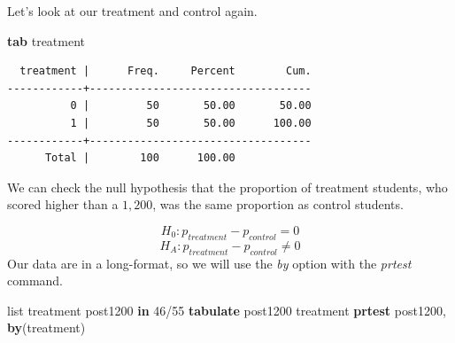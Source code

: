 \documentclass[
]{book}
\newenvironment{Shaded}{\begin{snugshade}}{\end{snugshade}}
\newcommand{\KeywordTok}[1]{\textcolor[rgb]{0.13,0.29,0.53}{\textbf{#1}}}
\newcommand{\NormalTok}[1]{#1}
\newcommand{\OtherTok}[1]{\textcolor[rgb]{0.56,0.35,0.01}{#1}}
\begin{document}
Let's look at our treatment and control again.

\begin{Shaded}
\begin{Highlighting}[]
\KeywordTok{tab}\NormalTok{ treatment}
\end{Highlighting}
\end{Shaded}

\begin{verbatim}
  treatment |      Freq.     Percent        Cum.
------------+-----------------------------------
          0 |         50       50.00       50.00
          1 |         50       50.00      100.00
------------+-----------------------------------
      Total |        100      100.00
\end{verbatim}

We can check the null hypothesis that the proportion of treatment students, who scored higher than a \(1,200\), was the same proportion as control students.

\[ H_{0}: p_{treatment} - p_{control} = 0 \]
\[ H_{A}: p_{treatment} - p_{control} \neq 0 \]
Our data are in a long-format, so we will use the \emph{by} option with the \emph{prtest} command.

\begin{Shaded}
\begin{Highlighting}[]
\OtherTok{list}\NormalTok{ treatment post1200 }\KeywordTok{in}\NormalTok{ 46/55}
\KeywordTok{tabulate}\NormalTok{ post1200 treatment}
\KeywordTok{prtest}\NormalTok{ post1200, }\KeywordTok{by}\NormalTok{(treatment)}
\end{Highlighting}
\end{Shaded}
\end{document}
